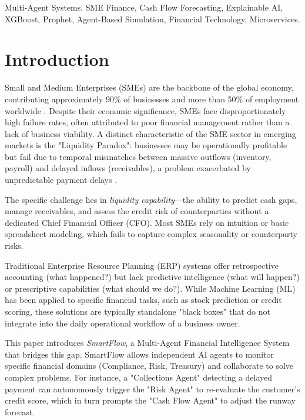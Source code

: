 \documentclass[conference]{IEEEtran}
\begin{document}
\begin{IEEEkeywords}
Multi-Agent Systems, SME Finance, Cash Flow Forecasting, Explainable AI, XGBoost, Prophet, Agent-Based Simulation, Financial Technology, Microservices.
\end{IEEEkeywords}

\section{Introduction}

Small and Medium Enterprises (SMEs) are the backbone of the global economy, contributing approximately 90\% of businesses and more than 50\% of employment worldwide \cite{jiang2024}. Despite their economic significance, SMEs face disproportionately high failure rates, often attributed to poor financial management rather than a lack of business viability. A distinct characteristic of the SME sector in emerging markets is the "Liquidity Paradox": businesses may be operationally profitable but fail due to temporal mismatches between massive outflows (inventory, payroll) and delayed inflows (receivables), a problem exacerbated by unpredictable payment delays \cite{paramasivan2025}.

The specific challenge lies in \textit{liquidity capability}---the ability to predict cash gaps, manage receivables, and assess the credit risk of counterparties without a dedicated Chief Financial Officer (CFO). Most SMEs rely on intuition or basic spreadsheet modeling, which fails to capture complex seasonality or counterparty risks.

Traditional Enterprise Resource Planning (ERP) systems offer retrospective accounting (what happened?) but lack predictive intelligence (what will happen?) or prescriptive capabilities (what should we do?). While Machine Learning (ML) has been applied to specific financial tasks, such as stock prediction or credit scoring, these solutions are typically standalone "black boxes" that do not integrate into the daily operational workflow of a business owner.

This paper introduces \textit{SmartFlow}, a Multi-Agent Financial Intelligence System that bridges this gap. SmartFlow allows independent AI agents to monitor specific financial domains (Compliance, Risk, Treasury) and collaborate to solve complex problems. For instance, a "Collections Agent" detecting a delayed payment can autonomously trigger the "Risk Agent" to re-evaluate the customer's credit score, which in turn prompts the "Cash Flow Agent" to adjust the runway forecast.
\end{document}
